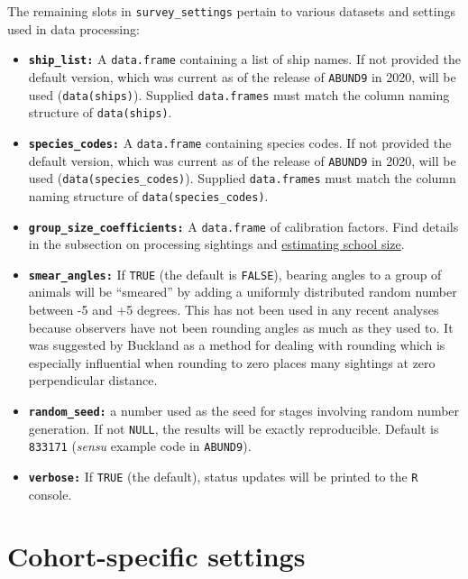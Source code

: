 \documentclass[
]{book}
\begin{document}
The remaining slots in \texttt{survey\_settings} pertain to various datasets and settings used in data processing:

\begin{itemize}
\item
  \textbf{\texttt{ship\_list:}} A \texttt{data.frame} containing a list of ship names. If not provided the default version, which was current as of the release of \texttt{ABUND9} in 2020, will be used (\texttt{data(ships)}). Supplied \texttt{data.frames} must match the column naming structure of \texttt{data(ships)}.
\item
  \textbf{\texttt{species\_codes:}} A \texttt{data.frame} containing species codes. If not provided the default version, which was current as of the release of \texttt{ABUND9} in 2020, will be used (\texttt{data(species\_codes)}). Supplied \texttt{data.frames} must match the column naming structure of \texttt{data(species\_codes)}.
\item
  \textbf{\texttt{group\_size\_coefficients:}} A \texttt{data.frame} of calibration factors. Find details in the subsection on processing sightings and \protect\hyperlink{ss_calibration}{estimating school size}.
\item
  \textbf{\texttt{smear\_angles:}} If \texttt{TRUE} (the default is \texttt{FALSE}), bearing angles to a group of animals will be ``smeared'' by adding a uniformly distributed random number between -5 and +5 degrees. This has not been used in any recent analyses because observers have not been rounding angles as much as they used to. It was suggested by Buckland as a method for dealing with rounding which is especially influential when rounding to zero places many sightings at zero perpendicular distance.
\item
  \textbf{\texttt{random\_seed:}} a number used as the seed for stages involving random number generation. If not \texttt{NULL}, the results will be exactly reproducible. Default is \texttt{833171} (\emph{sensu} example code in \texttt{ABUND9}).
\item
  \textbf{\texttt{verbose:}} If \texttt{TRUE} (the default), status updates will be printed to the \texttt{R} console.
\end{itemize}

\hypertarget{cohort-specific-settings}{%
\section*{Cohort-specific settings}\label{cohort-specific-settings}}
\end{document}
